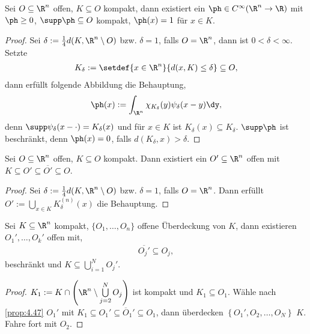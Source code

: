 \begin{lem}
\label{prop:4.46}
Sei $O\subseteq\R^n$ offen, $K\subseteq O$ kompakt, dann existiert ein $\ph\in
C^\infty(\R^n\to\R)$ mit $\ph\ge0$, $\supp \ph \subseteq O$ kompakt, $\ph(x) =
1$ für $x\in K$.\fishhere
\end{lem}
\begin{proof}
Sei $\delta:=\frac{1}{4}d(K,\R^n\setminus O)$ bzw. $\delta = 1$, falls
$O=\R^n$, dann ist $0<\delta <\infty$. Setzte
\begin{align*}
K_\delta := \setdef{x\in\R^n}{d(x,K)\le\delta} \subseteq O,
\end{align*}
dann erfüllt folgende Abbildung die Behauptung,
\begin{align*}
\ph(x) := \int_{\R^n} \chi_{K_\delta}(y)\psi_\delta(x-y)\dy,
\end{align*}
denn $\supp\psi_\delta(x-\cdot)=K_\delta(x)$ und für $x\in K$ ist
$K_\delta(x)\subseteq K_\delta$. $\supp\ph$ ist beschränkt, denn
$\ph(x)=0$, falls $d(K_\delta,x)>\delta$.\qedhere
\end{proof}

\begin{lem}
\label{prop:4.47}
Sei $O\subseteq\R^n$ offen, $K\subseteq O$ kompakt. Dann existiert ein
$O'\subseteq\R^n$ offen mit $K\subseteq O'\subseteq \overline{O'}\subseteq
O$.\fishhere
\end{lem}
\begin{proof}
Sei $\delta:=\frac{1}{4}d(K,\R^n\setminus O)$ bzw. $\delta = 1$, falls
$O=\R^n$. Dann erfüllt $O':=\bigcup\limits_{x\in K} K_\delta^{(n)}(x)$ die
Behauptung.\qedhere
\end{proof}

\begin{lem}
\label{prop:4.48}
Sei $K\subseteq \R^n$ kompakt, $\{O_1,\ldots,O_n\}$ offene Überdeckung von $K$,
dann existieren $O_1',\ldots,O_k'$ offen mit,
\begin{align*}
\overline{O_j'}\subseteq O_j,
\end{align*}
beschränkt und $K\subseteq\bigcup_{i=1}^N O_j'$.\fishhere
\end{lem}
\begin{proof}
$K_1 := K\cap \left(\R^n\setminus\bigcup\limits_{j=2}^N O_j\right)$ ist kompakt
und $K_1\subseteq O_1$. Wähle nach \ref{prop:4.47} $O_1'$ mit $K_1\subseteq
O_1'\subseteq\overline{O}_1'\subseteq O_1$, dann überdecken
$\left\{O_1',O_2,\ldots,O_N\right\}$ $K$. Fahre fort mit $O_2$.\qedhere
\end{proof}

